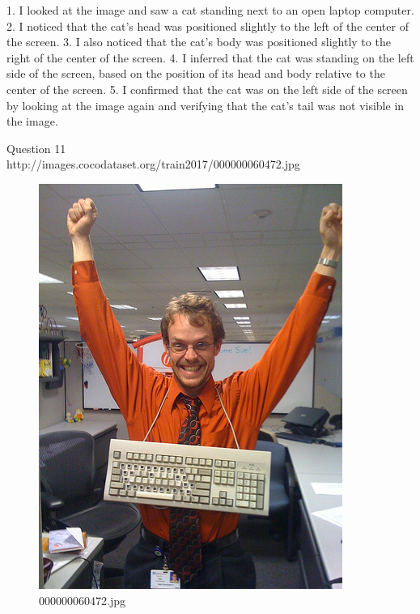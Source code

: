 \begin{enumerate}
        1. I looked at the image and saw a cat standing next to an open laptop computer.
        2. I noticed that the cat’s head was positioned slightly to the left of the center of the screen.
        3. I also noticed that the cat’s body was positioned slightly to the right of the center of the screen.
        4. I inferred that the cat was standing on the left side of the screen, based on the position of its head and body relative to the center of the screen.
        5. I confirmed that the cat was on the left side of the screen by looking at the image again and verifying that the cat’s tail was not visible in the image.
        
    \end{enumerate}
Question 11\\
http://images.cocodataset.org/train2017/000000060472.jpg
    \begin{figure}[h]
        \centering
        \includegraphics[width=0.8\linewidth]{../image set/easy/000000060472.jpg}
        \caption{000000060472.jpg}
    \end{figure}
